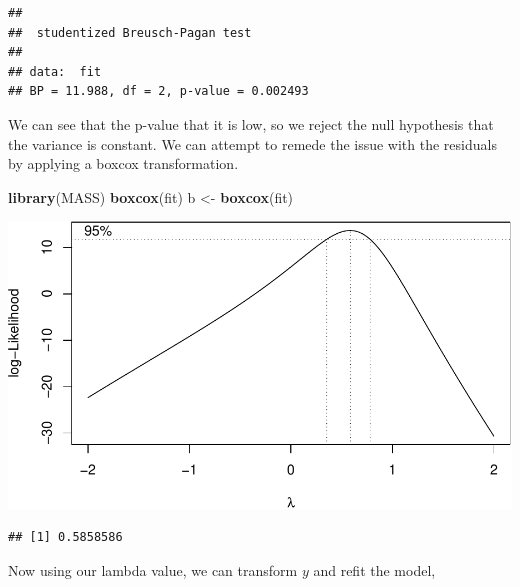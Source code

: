 \documentclass[
  11pt,
]{article}
\newenvironment{Shaded}{\begin{snugshade}}{\end{snugshade}}
\newcommand{\FunctionTok}[1]{\textcolor[rgb]{0.13,0.29,0.53}{\textbf{#1}}}
\newcommand{\NormalTok}[1]{#1}
\newcommand{\OtherTok}[1]{\textcolor[rgb]{0.56,0.35,0.01}{#1}}
\newcommand{\SpecialCharTok}[1]{\textcolor[rgb]{0.81,0.36,0.00}{\textbf{#1}}}
\begin{document}
\begin{verbatim}
## 
##  studentized Breusch-Pagan test
## 
## data:  fit
## BP = 11.988, df = 2, p-value = 0.002493
\end{verbatim}

We can see that the p-value that it is low, so we reject the null
hypothesis that the variance is constant. We can attempt to remede the
issue with the residuals by applying a boxcox transformation.

\begin{Shaded}
\begin{Highlighting}[]
\FunctionTok{library}\NormalTok{(MASS)}
\FunctionTok{boxcox}\NormalTok{(fit)}
\NormalTok{b }\OtherTok{\textless{}{-}} \FunctionTok{boxcox}\NormalTok{(fit)}
\end{Highlighting}
\end{Shaded}

\includegraphics{examples_files/figure-latex/unnamed-chunk-29-1.pdf}

\begin{Shaded}
\end{Shaded}

\begin{verbatim}
## [1] 0.5858586
\end{verbatim}

Now using our lambda value, we can transform \(y\) and refit the model,
\end{document}
